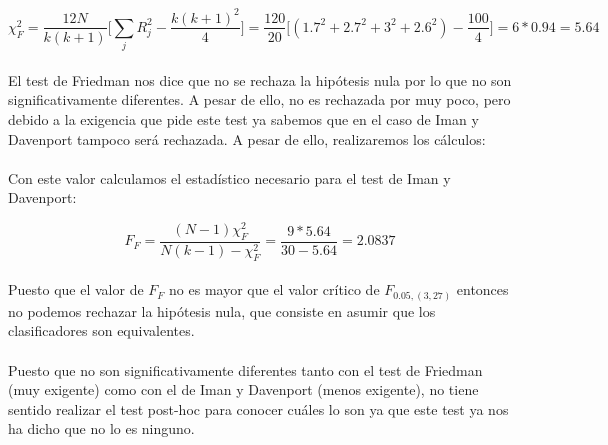 \documentclass[10pt, a4paper,spanish]{article}
\begin{document}
		\[
		\chi_{F}^2 = \frac{12N}{k(k+1)}\Big[\displaystyle\sum_{j}R_{j}^2 - \frac{k(k+1)^2}{4}\Big] = \frac{120}{20}\Big[(1.7^2+ 2.7^2+3^2+2.6^2) - \frac{100}{4}\Big] = 6 * 0.94 = 5.64\]

		\paragraph{}
		El test de Friedman nos dice que no se rechaza la hipótesis nula por lo que no son significativamente diferentes. A pesar de ello, no es rechazada por muy poco, pero debido a la exigencia que pide este test ya sabemos que en el caso de Iman y Davenport tampoco será rechazada. A pesar de ello, realizaremos los cálculos:

		\paragraph{}
		Con este valor calculamos el estadístico necesario para el test de Iman y Davenport:

		\[F_{F}= \frac{(N-1)\chi_{F}^2}{N(k-1)-\chi_{F}^2} = \frac{9 * 5.64}{30-5.64} = 2.0837 \]

		\paragraph{}
		Puesto que el valor de $F_{F}$ no es mayor que el valor crítico de $F_{0.05, (3,27)}$ entonces no podemos rechazar la hipótesis nula, que consiste en asumir que los clasificadores son equivalentes.

		\paragraph{}
		Puesto que no son significativamente diferentes tanto con el test de Friedman (muy exigente) como con el de Iman y Davenport (menos exigente), no tiene sentido realizar el test post-hoc para conocer cuáles lo son ya que este test ya nos ha dicho que no lo es ninguno.
\end{document}
